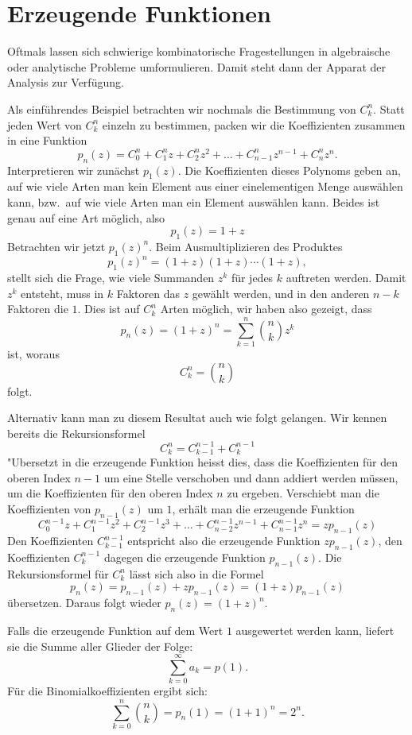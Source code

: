 \section{Erzeugende Funktionen}
Oftmals lassen sich schwierige kombinatorische Fragestellungen in
algebraische oder analytische Probleme umformulieren.
Damit steht
dann der Apparat der Analysis zur Verfügung.

Als einführendes
Beispiel betrachten wir nochmals die Bestimmung von $C^n_k$.
Statt jeden Wert von $C^n_k$ einzeln zu bestimmen, packen wir
die Koeffizienten zusammen in eine Funktion
\[
p_n(z)=C^n_0+C^n_1z +C^n_2z^2+\dots+C^n_{n-1}z^{n-1}+C^n_nz^n.
\]
Interpretieren wir zunächst $p_1(z)$.
Die Koeffizienten dieses
Polynoms geben an, auf wie viele Arten man kein Element aus einer
einelementigen Menge auswählen kann, bzw.~auf wie viele Arten man 
ein Element auswählen kann.
Beides ist genau auf eine Art möglich,
also
\[
p_1(z)=1+z
\]
Betrachten wir jetzt $p_1(z)^n$.
Beim Ausmultiplizieren des
Produktes 
\[
p_1(z)^n= (1+z)(1+z)\dotsm(1+z),
\]
stellt sich die Frage, wie viele Summanden $z^k$ für jedes
$k$ auftreten werden.
Damit $z^k$ entsteht, muss in $k$ Faktoren das $z$ gewählt werden,
und in den anderen $n-k$ Faktoren die $1$.
Dies ist auf $C^n_k$
Arten möglich, wir haben also gezeigt, dass
\[
p_n(z)=(1+z)^n=\sum_{k=1}^n \binom{n}{k}z^k
\]
ist, woraus
\[
C^n_k=\binom{n}{k}
\]
folgt.

Alternativ kann man zu diesem Resultat auch wie folgt gelangen.
Wir kennen bereits die Rekursionsformel
\[
C^n_k=C^{n-1}_{k-1}+C^{n-1}_k
\]
"Ubersetzt in die erzeugende Funktion heisst dies, dass die Koeffizienten
für den oberen Index $n-1$
um eine Stelle verschoben und dann addiert werden müssen,
um die Koeffizienten für den oberen Index $n$ zu ergeben.
Verschiebt
man die Koeffizienten von $p_{n-1}(z)$ um $1$,
erhält man die erzeugende Funktion
\[
C^{n-1}_0z
+C^{n-1}_1z^2
+C^{n-1}_2z^3
+\dots
+C^{n-1}_{n-2}z^{n-1}
+C^{n-1}_{n-1}z^n
=zp_{n-1}(z)
\]
Den Koeffizienten $C^{n-1}_{k-1}$ entspricht also die
erzeugende Funktion $zp_{n-1}(z)$,
den Koeffizienten $C^{n-1}_k$ dagegen die erzeugende Funktion $p_{n-1}(z)$.
Die Rekursionsformel für $C^n_k$ lässt sich also in die Formel
\[
p_n(z)=p_{n-1}(z)+zp_{n-1}(z)=(1+z)p_{n-1}(z)
\]
übersetzen.
Daraus folgt wieder $p_n(z)=(1+z)^n$.

Falls die erzeugende Funktion auf dem Wert $1$ ausgewertet werden kann,
liefert sie die Summe aller Glieder der Folge:
\[
\sum_{k=0}^\infty a_k=p(1).
\]
Für die Binomialkoeffizienten ergibt sich:
\[
\sum_{k=0}^n\binom{n}{k}=p_n(1)=(1+1)^n=2^n.
\]

